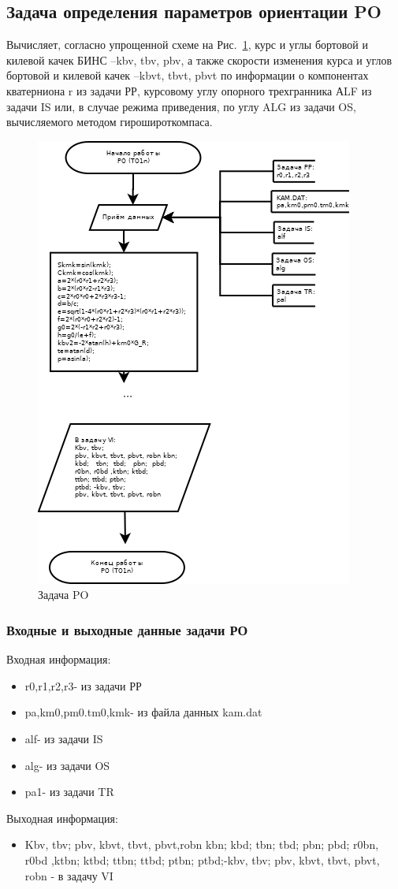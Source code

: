 \subsection{Задача определения параметров ориентации PO}
Вычисляет, согласно упрощенной схеме на Рис.~\ref{fig:PO}, курс и углы бортовой и килевой качек БИНС –kbv,  tbv,  pbv,  
а  также скорости изменения курса и углов бортовой и килевой качек –kbvt,  tbvt,  pbvt  по  информации о компонентах кватерниона  r 
из задачи РР,  курсовому углу опорного трехгранника АLF из  задачи IS или,  в случае режима приведения, по  углу  ALG из  задачи  OS, 
вычисляемого методом гирошироткомпаса.
\begin{figure}[H]
    \centering
    \includegraphics[width=0.5\linewidth]{images/PO_simple.png}
    \caption{Задача PO}
    \label{fig:PO}
\end{figure}
\subsubsection{Входные и выходные данные задачи РО}
Входная информация:
\begin{itemize}
\item r0,r1,r2,r3- из задачи  РР
\item pa,km0,pm0.tm0,kmk- из файла данных kam.dat
\item alf- из задачи  IS
\item alg- из задачи  OS
\item pa1- из задачи  TR
\end{itemize}
Выходная информация:
\begin{itemize}
    \item Kbv, tbv; pbv, kbvt, tbvt, pbvt,robn kbn; kbd;   tbn;  tbd;   pbn;  pbd; r0bn,   
    r0bd ,ktbn; ktbd; ttbn; ttbd; ptbn; ptbd;-kbv, tbv; pbv, kbvt, tbvt, pbvt, robn - в задачу VI
\end{itemize}

